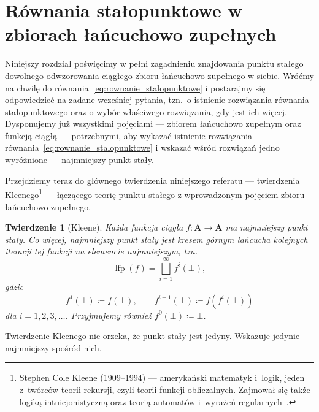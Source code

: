 \documentclass[11pt,a4paper]{article}
\theoremstyle{definition}
\theoremstyle{plain}
\newtheorem{twierdzenie}[definicja]{Twierdzenie}
\newcommand{\bt}{\bot}                            %
\newcommand{\lfp}{\operatorname{lfp}}
\begin{document}
\section{Równania stałopunktowe w zbiorach łańcuchowo zupełnych}

Niniejszy rozdział poświęcimy w pełni zagadnieniu znajdowania punktu stałego
dowolnego odwzorowania ciągłego zbioru łańcuchowo zupełnego w siebie. Wróćmy na
chwilę do równania~\eqref{eq:rownanie_stalopunktowe} i postarajmy się odpowiedzieć na
zadane wcześniej pytania, tzn.\ o istnienie rozwiązania równania stałopunktowego oraz
o wybór właściwego rozwiązania, gdy jest ich więcej. Dysponujemy już wszystkimi pojęciami --- zbiorem łańcuchowo zupełnym oraz funkcją ciągłą --- potrzebnymi, aby wykazać istnienie rozwiązania równania~\eqref{eq:rownanie_stalopunktowe} i wskazać wśród rozwiązań jedno wyróżnione --- najmniejszy punkt stały.

Przejdziemy teraz do głównego twierdzenia niniejszego referatu --- twierdzenia Kleenego\footnote{Stephen Cole Kleene (1909--1994) --- amerykański matematyk i~logik, jeden z~twórców teorii rekursji, czyli teorii funkcji obliczalnych. Zajmował się także logiką intuicjonistyczną oraz teorią automatów i~wyrażeń regularnych~\cite{kleene1952}.} --- łączącego teorię punktu stałego z wprowadzonym pojęciem zbioru łańcuchowo zupełnego.

\begin{twierdzenie}[Kleene]\label{tw:kleene}
	Każda funkcja ciągła $f:\boldsymbol{A}\to\boldsymbol{A}$ ma najmniejszy
	punkt stały. Co więcej, najmniejszy punkt stały jest kresem górnym
	łańcucha kolejnych iteracji tej funkcji na elemencie najmniejszym, tzn.
	\[
	\lfp(f)=\bigsqcup_{i=1}^\infty f^i(\bt),
	\]
	gdzie
	\[
	f^1(\bt)\coloneqq f(\bt),
	\qquad
	f^{i+1}(\bt)\coloneqq f\!\left(f^i(\bt)\right)
	\]
	dla $i=1,2,3,\ldots$. Przyjmujemy również $f^0(\bt)\coloneqq\bt$.
\end{twierdzenie}

Twierdzenie Kleenego nie orzeka, że punkt stały jest jedyny. Wskazuje
jedynie najmniejszy spośród nich.
\end{document}
